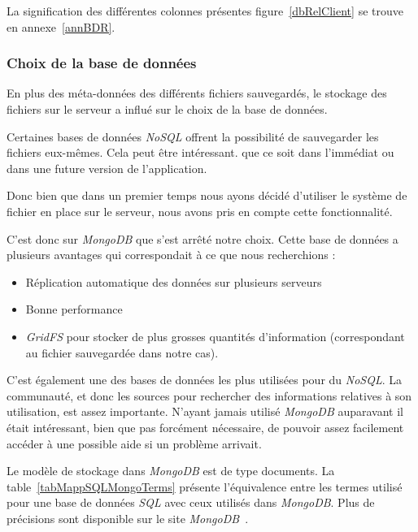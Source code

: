 \documentclass[a4paper,10pt, twoside]{report}
\begin{document}
\begin{spacing}{1.2}
La signification des diff\'erentes colonnes pr\'esentes figure~\ref{dbRelClient}
se trouve en annexe~\ref{annBDR}.

\subsubsection{Choix de la base de donn\'ees}
En plus des m\'eta-donn\'ees des diff\'erents fichiers sauvegard\'es, le
stockage des fichiers sur le serveur a influ\'e sur le choix de la base de
donn\'ees. 

Certaines bases de donn\'ees \textit{NoSQL} offrent la possibilit\'e de 
sauvegarder les fichiers eux-m\^emes. Cela peut \^etre int\'eressant. que ce
soit dans l'imm\'ediat ou dans une future version de l'application.

Donc bien que dans un premier temps nous ayons d\'ecid\'e d'utiliser le
syst\`eme de fichier en place sur le serveur, nous avons pris en compte cette
fonctionnalit\'e.

C'est donc sur \textit{MongoDB} que s'est arr\^et\'e notre choix. Cette base
de donn\'ees a plusieurs avantages qui correspondait \`a ce que nous
recherchions :

\begin{itemize}
 \item R\'eplication automatique des donn\'ees sur plusieurs serveurs
 \item Bonne performance
 \item \textit{GridFS} pour stocker de plus grosses quantit\'es d'information
 (correspondant au fichier sauvegard\'ee dans notre cas).
\end{itemize}

C'est \'egalement une des bases de donn\'ees les plus utilis\'ees pour du
\textit{NoSQL}. La communaut\'e, et donc les sources pour rechercher des
informations relatives \`a son utilisation, est assez importante. N'ayant
jamais utilis\'e \textit{MongoDB} auparavant il \'etait int\'eressant, bien que
pas forc\'ement n\'ecessaire, de pouvoir assez facilement acc\'eder \`a une
possible aide si un probl\`eme arrivait.

Le mod\`ele de stockage dans \textit{MongoDB} est de type documents. La
table~\ref{tabMappSQLMongoTerms} pr\'esente l'\'equivalence entre les termes
utilis\'e pour une base de donn\'ees \textit{SQL} avec ceux utilis\'es dans
\textit{MongoDB}. Plus de pr\'ecisions sont disponible sur le site
\textit{MongoDB}~\cite{refMappingSQLMDB}.


\end{spacing}
\end{document}
